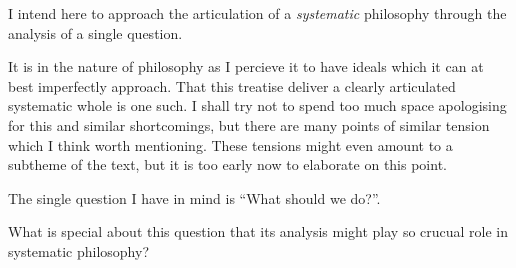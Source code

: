\documentclass[10pt,titlepage]{article}
\begin{document}
I intend here to approach the articulation of a \emph{systematic} philosophy through the analysis of a single question.

It is in the nature of philosophy as I percieve it to have ideals which it can at best imperfectly approach.
That this treatise deliver a clearly articulated systematic whole is one such.
I shall try not to spend too much space apologising for this and similar shortcomings, but there are many points of similar tension which I think worth mentioning.
These tensions might even amount to a subtheme of the text, but it is too early now to elaborate on this point.

The single question I have in mind is ``What should we do?''.

What is special about this question that its analysis might play so crucual role in systematic philosophy?



%
%






\end{document}
